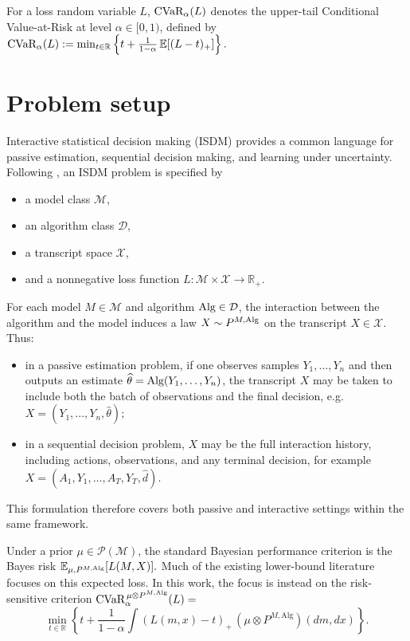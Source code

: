 \documentclass[conference]{IEEEtran}
\begin{document}
For a loss random variable \(L\), \(\textup{CVaR}_\alpha(L)\) denotes the upper-tail Conditional Value-at-Risk at level \(\alpha\in[0,1)\), defined by
\(
\textup{CVaR}_\alpha(L)
:=
\min_{t\in\mathbb{R}}
\left\{
t+\frac{1}{1-\alpha}\,\mathbb{E}[(L-t)_+]
\right\}.
\)


\section{Problem setup}

Interactive statistical decision making (ISDM) provides a common language for passive estimation, sequential decision making, and learning under uncertainty. Following \cite{chen2024assouad}, an ISDM problem is specified by
\begin{itemize}
    \item a model class \(\mathcal{M}\),
    \item an algorithm class \(\mathcal{D}\),
    \item a transcript space \(\mathcal{X}\),
    \item and a nonnegative loss function
    \(
    L:\mathcal{M}\times \mathcal{X}\to \mathbb{R}_+.
    \)
\end{itemize}

For each model \(M\in\mathcal{M}\) and algorithm \(\textup{Alg}\in\mathcal{D}\), the interaction between the algorithm and the model induces a law
\(
X\sim P^{M,\textup{Alg}}
\)
on the transcript \(X\in\mathcal{X}\). Thus:
\begin{itemize}
    \item in a passive estimation problem, if one observes samples \(Y_1,\dots,Y_n\) and then outputs an estimate \(\widehat\theta=\textup{Alg}(Y_1,\dots,Y_n)\), the transcript \(X\) may be taken to include both the batch of observations and the final decision, e.g.
    \(
    X=(Y_1,\dots,Y_n,\widehat\theta);
    \)
    \item in a sequential decision problem, \(X\) may be the full interaction history, including actions, observations, and any terminal decision, for example
    \(
    X=(A_1,Y_1,\dots,A_T,Y_T,\widehat d).
    \)
\end{itemize}
This formulation therefore covers both passive and interactive settings within the same framework.

Under a prior \(\mu\in\mathcal{P}(\mathcal{M})\), the standard Bayesian performance criterion is the Bayes risk
\(
\mathbb{E}_{\mu,P^{M,\textup{Alg}}}[L(M,X)].
\)
Much of the existing lower-bound literature focuses on this expected loss. In this work, the focus is instead on the risk-sensitive criterion
\(
\textup{CVaR}^{\,\mu\otimes P^{M,\mathrm{Alg}}}_\alpha(L) =
\)
\[
\min_{t\in\mathbb{R}}
\left\{
t+\frac{1}{1-\alpha}
\int (L(m,x)-t)_+\,(\mu\otimes P^{M,\mathrm{Alg}})(dm,dx)
\right\}.
\]
\end{document}
